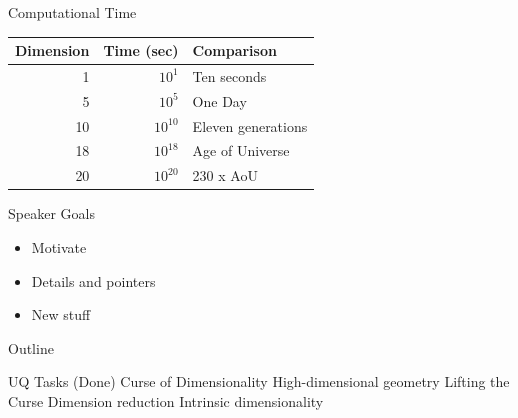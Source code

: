 \documentclass[14pt]{beamer}
\begin{document}
\begin{frame}{Computational Time}
  \begin{table}
    \begin{tabular}{r|r|l}
    \hline
    Dimension & Time (sec) & Comparison\\
    \hline
    1 & $10^{1}$ & Ten seconds\\
    \hline
    5 & $10^{5}$ & One Day\\
    \hline
    10 & $10^{10}$ & Eleven generations\\
    \hline
    18 & $10^{18}$ & Age of Universe\\
    \hline
    20 & $10^{20}$ & 230 x AoU\\
    \hline
    \end{tabular}
  \end{table}
\end{frame}



\begin{frame}{Speaker Goals}
  \begin{itemize}
  \item Motivate
  \item Details and pointers
  \item New stuff
  \end{itemize}
\end{frame}

\begin{frame}{Outline}
  \begin{outline}
  \1 UQ Tasks (Done)
  \1 Curse of Dimensionality
    \2 High-dimensional geometry
  \1 Lifting the Curse
    \2 Dimension reduction
    \2 Intrinsic dimensionality
  \end{outline}
\end{frame}
\end{document}
